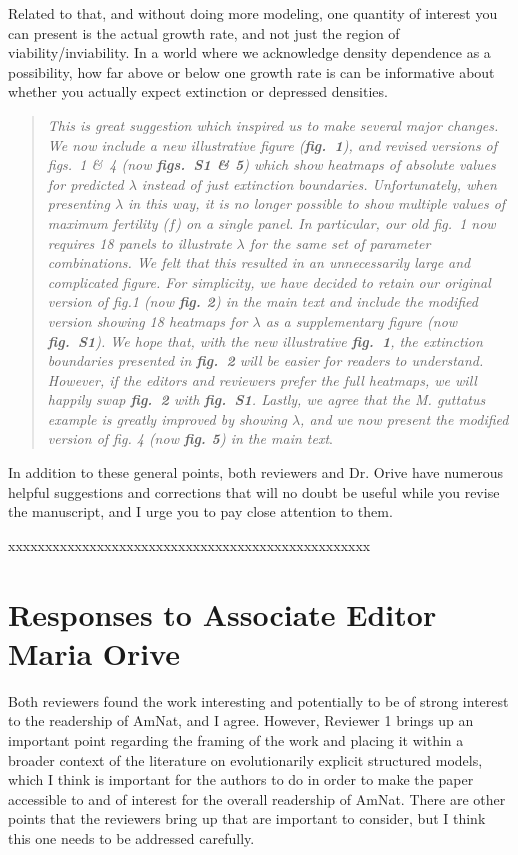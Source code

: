 \documentclass[11pt]{article}
\begin{document}
Related to that, and without doing more modeling, one quantity of interest you can present is the actual growth rate, and not just the region of viability/inviability. In a world where we acknowledge density dependence as a possibility, how far above or below one growth rate is can be informative about whether you actually expect extinction or depressed densities.

\begin{quote}
	{\itshape This is great suggestion which inspired us to make several major changes. We now include a new illustrative figure ({\bf fig.~1}), and revised versions of figs.~1 \&~4 (now {\bf figs.~S1 \& 5}) which show heatmaps of absolute values for predicted $\lambda$ instead of just extinction boundaries. Unfortunately, when presenting $\lambda$ in this way, it is no longer possible to show multiple values of maximum fertility ($f$) on a single panel. In particular, our old fig.~1 now requires 18 panels to illustrate $\lambda$ for the same set of parameter combinations. We felt that this resulted in an unnecessarily large and complicated figure. For simplicity, we have decided to retain our original version of fig.1 (now {\bf fig. 2}) in the main text and include the modified version showing 18 heatmaps for $\lambda$ as a supplementary figure (now {\bf fig.~S1}). We hope that, with the new illustrative {\bf fig.~1}, the extinction boundaries presented in {\bf fig.~2} will be easier for readers to understand. However, if the editors and reviewers prefer the full heatmaps, we will happily swap {\bf fig.~2} with {\bf fig.~S1}. Lastly, we agree that the {\itshape M. guttatus} example is greatly improved by showing $\lambda$, and we now present the modified version of fig. 4 (now {\bf fig. 5}) in the main text}.
\end{quote}


In addition to these general points, both reviewers and Dr. Orive have numerous helpful suggestions and corrections that will no doubt be useful while you revise the manuscript, and I urge you to pay close attention to them.
\bigskip


\noindent xxxxxxxxxxxxxxxxxxxxxxxxxxxxxxxxxxxxxxxxxxxxxxxxx

\section*{Responses to Associate Editor Maria Orive}

Both reviewers found the work interesting and potentially to be of strong interest to the readership of AmNat, and I agree. However, Reviewer 1 brings up an important point regarding the framing of the work and placing it within a broader context of the literature on evolutionarily explicit structured models, which I think is important for the authors to do in order to make the paper accessible to and of interest for the overall readership of AmNat. There are other points that the reviewers bring up that are important to consider, but I think this one needs to be addressed carefully.
\end{document}
